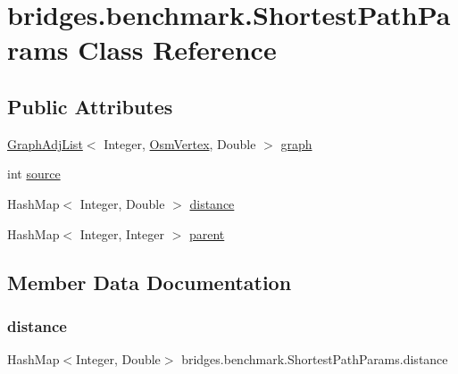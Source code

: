 \hypertarget{classbridges_1_1benchmark_1_1_shortest_path_params}{}\section{bridges.\+benchmark.\+Shortest\+Path\+Params Class Reference}
\label{classbridges_1_1benchmark_1_1_shortest_path_params}
\subsection*{Public Attributes}
\begin{DoxyCompactItemize}
\item 
\mbox{\hyperlink{classbridges_1_1base_1_1_graph_adj_list}{Graph\+Adj\+List}}$<$ Integer, \mbox{\hyperlink{classbridges_1_1data__src__dependent_1_1_osm_vertex}{Osm\+Vertex}}, Double $>$ \mbox{\hyperlink{classbridges_1_1benchmark_1_1_shortest_path_params_a75cd38cc65e6e3979668291496f39a69}{graph}}
\item 
int \mbox{\hyperlink{classbridges_1_1benchmark_1_1_shortest_path_params_af3eb9881b40a82c81dfcc712f615628e}{source}}
\item 
Hash\+Map$<$ Integer, Double $>$ \mbox{\hyperlink{classbridges_1_1benchmark_1_1_shortest_path_params_a4fd89d26952a6e678436ef7cc46042c0}{distance}}
\item 
Hash\+Map$<$ Integer, Integer $>$ \mbox{\hyperlink{classbridges_1_1benchmark_1_1_shortest_path_params_a80973b4690d38af2030479a03e353800}{parent}}
\end{DoxyCompactItemize}


\subsection{Member Data Documentation}
\mbox{\label{classbridges_1_1benchmark_1_1_shortest_path_params_a4fd89d26952a6e678436ef7cc46042c0}} 
\subsubsection{\texorpdfstring{distance}{distance}}
{\footnotesize\ttfamily Hash\+Map$<$Integer, Double$>$ bridges.\+benchmark.\+Shortest\+Path\+Params.\+distance}

